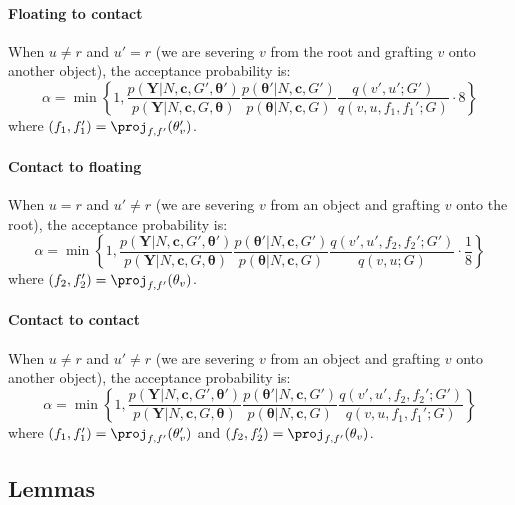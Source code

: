 \paragraph{Floating to contact}
When $u \ne r$ and $u' = r$
(we are severing $v$ from the root and grafting $v$ onto another object),
the acceptance probability is:
\begin{equation}
\alpha = \min\left\{
1, 
\frac{p(\mathbf{Y} | N, \mathbf{c}, G', \bm\theta')}{p(\mathbf{Y} | N, \mathbf{c}, G, \bm\theta)}
\frac{p(\bm\theta' | N, \mathbf{c}, G')}{p(\bm\theta | N, \mathbf{c}, G)}
\frac{q(v', u'; G')}{q(v, u, f_1, f_1'; G)}
\cdot
8
\right\}
\end{equation}
where $(f_1, f_1') = \proj_{f,f'}(\theta'_v)$.

\paragraph{Contact to floating}
When $u = r$ and $u' \ne r$
(we are severing $v$ from an object and grafting $v$ onto the root),
the acceptance probability is:
\begin{equation}
\alpha = \min\left\{
1, 
\frac{p(\mathbf{Y} | N, \mathbf{c}, G', \bm\theta')}{p(\mathbf{Y} | N, \mathbf{c}, G, \bm\theta)}
\frac{p(\bm\theta' | N, \mathbf{c}, G')}{p(\bm\theta | N, \mathbf{c}, G)}
\frac{q(v', u', f_2, f_2'; G')}{q(v, u; G)}
\cdot
\frac{1}{8}
\right\}
\end{equation}
where $(f_2, f_2') = \proj_{f,f'}(\theta_v)$.

\paragraph{Contact to contact}
When $u \ne r$ and $u' \ne r$
(we are severing $v$ from an object and grafting $v$ onto another object),
the acceptance probability is:
\begin{equation}
\alpha = \min\left\{
1, 
\frac{p(\mathbf{Y} | N, \mathbf{c}, G', \bm\theta')}{p(\mathbf{Y} | N, \mathbf{c}, G, \bm\theta)}
\frac{p(\bm\theta' | N, \mathbf{c}, G')}{p(\bm\theta | N, \mathbf{c}, G)}
\frac{q(v', u', f_2, f_2'; G')}{q(v, u, f_1, f_1'; G)}
\right\}
\end{equation}
where $(f_1, f_1') = \proj_{f,f'}(\theta'_v)$ and $(f_2, f_2') = \proj_{f,f'}(\theta_v)$.

\subsection{Lemmas}

